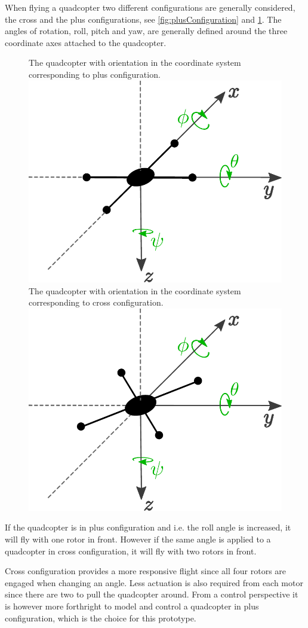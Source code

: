 When flying a quadcopter two different configurations are generally considered, the cross and the plus configurations, see \autoref{fig:plusConfiguration} and \ref{fig:crossConfiguration}. The angles of rotation, roll, pitch and yaw, are generally defined around the three coordinate axes attached to the quadcopter. \cite{HLChan}
%
\begin{figure}[H]
  \centering
  \captionbox
  {
    The quadcopter with orientation in the coordinate system corresponding to plus configuration.
    \label{fig:plusConfiguration}
  }
  {
    \includegraphics[width=.44\textwidth]{figures/plusConfiguration}
  }
  \hspace{5pt}
  \captionbox
  {
    The quadcopter with orientation in the coordinate system corresponding to cross configuration.
    \label{fig:crossConfiguration}
  }
  {
    \includegraphics[width=.44\textwidth]{figures/crossConfiguration}
  }
\end{figure}
%
If the quadcopter is in plus configuration and i.e. the roll angle is increased, it will fly with one rotor in front. However if the same angle is applied to a quadcopter in cross configuration, it will fly with two rotors in front. \cite{HLChan}

Cross configuration provides a more responsive flight since all four rotors are engaged when changing an angle. Less actuation is also required from each motor since there are two to pull the quadcopter around. From a control perspective it is however more forthright to model and control a quadcopter in plus configuration, which is the choice for this prototype. \cite{HLChan}


